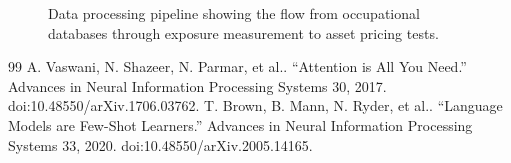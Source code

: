 \documentclass{article}
\begin{document}
\begin{figure}[htbp]
\centering
{}
\caption{Data processing pipeline showing the flow from occupational databases through exposure measurement to asset pricing tests.}
\end{figure}




\begin{thebibliography}{99}
 A. Vaswani, N. Shazeer, N. Parmar, et al.. ``Attention is All You Need.'' Advances in Neural Information Processing Systems 30, 2017. doi:10.48550/arXiv.1706.03762.
 T. Brown, B. Mann, N. Ryder, et al.. ``Language Models are Few-Shot Learners.'' Advances in Neural Information Processing Systems 33, 2020. doi:10.48550/arXiv.2005.14165.
\end{thebibliography}
\end{document}
